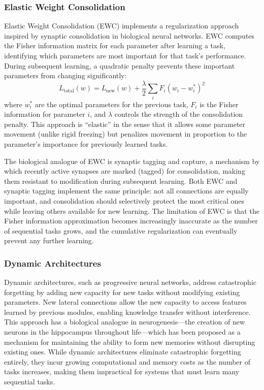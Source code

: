 \subsubsection{Elastic Weight Consolidation}

Elastic Weight Consolidation (EWC) \citep{kirkpatrick2017overcoming} implements a regularization approach inspired by synaptic consolidation in biological neural networks. EWC computes the Fisher information matrix for each parameter after learning a task, identifying which parameters are most important for that task's performance. During subsequent learning, a quadratic penalty prevents these important parameters from changing significantly:
\begin{equation}
L_{\text{total}}(w) = L_{\text{new}}(w) + \frac{\lambda}{2} \sum_i F_i (w_i - w_i^*)^2
\end{equation}
where $w_i^*$ are the optimal parameters for the previous task, $F_i$ is the Fisher information for parameter $i$, and $\lambda$ controls the strength of the consolidation penalty. This approach is ``elastic'' in the sense that it allows some parameter movement (unlike rigid freezing) but penalizes movement in proportion to the parameter's importance for previously learned tasks.

The biological analogue of EWC is synaptic tagging and capture, a mechanism by which recently active synapses are marked (tagged) for consolidation, making them resistant to modification during subsequent learning. Both EWC and synaptic tagging implement the same principle: not all connections are equally important, and consolidation should selectively protect the most critical ones while leaving others available for new learning. The limitation of EWC is that the Fisher information approximation becomes increasingly inaccurate as the number of sequential tasks grows, and the cumulative regularization can eventually prevent any further learning.

\subsubsection{Dynamic Architectures}

Dynamic architectures, such as progressive neural networks, address catastrophic forgetting by adding new capacity for new tasks without modifying existing parameters. New lateral connections allow the new capacity to access features learned by previous modules, enabling knowledge transfer without interference. This approach has a biological analogue in neurogenesis---the creation of new neurons in the hippocampus throughout life---which has been proposed as a mechanism for maintaining the ability to form new memories without disrupting existing ones. While dynamic architectures eliminate catastrophic forgetting entirely, they incur growing computational and memory costs as the number of tasks increases, making them impractical for systems that must learn many sequential tasks.

